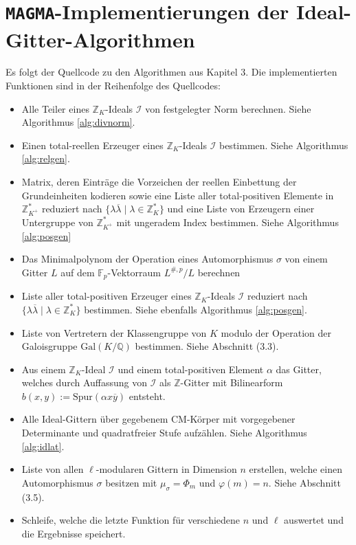 \documentclass[12pt,a4paper,halfparskip,headsepline,bibtotocnumbered]{scrreprt}
\theoremstyle{nummermitklammern}
\theoremstyle{nonumberbreak}
\newcommand{\Z}{\mathbb{Z}}
\newcommand{\Q}{\mathbb{Q}}
\newcommand{\F}{\mathbb{F}}
\newcommand{\I}{\mathcal{I}}
\begin{document}
\section{\texttt{MAGMA}-Implementierungen der Ideal-Gitter-Algorithmen}
Es folgt der Quellcode zu den Algorithmen aus Kapitel 3. Die implementierten Funktionen sind in der Reihenfolge des Quellcodes:
\begin{itemize}
	\item Alle Teiler eines $\Z_K$-Ideals $\I$ von festgelegter Norm berechnen. Siehe Algorithmus \eqref{alg:divnorm}.
	\item Einen total-reellen Erzeuger eines $\Z_K$-Ideals $\I$ bestimmen. Siehe Algorithmus \eqref{alg:relgen}.
	\item Matrix, deren Einträge die Vorzeichen der reellen Einbettung der Grundeinheiten kodieren sowie eine Liste aller total-positiven Elemente in $\Z_{K^+}^\ast$ reduziert nach $\lbrace \lambda \overline{\lambda} \mid \lambda \in \Z_K^\ast \rbrace$ und eine Liste von Erzeugern einer Untergruppe von $\Z_{K^+}^\ast$ mit ungeradem Index bestimmen. Siehe Algorithmus \eqref{alg:posgen}
	\item Das Minimalpolynom der Operation eines Automorphismus $\sigma$ von einem Gitter $L$ auf dem $\F_p$-Vektorraum $L^{\#,p}/L$ berechnen
	\item Liste aller total-positiven Erzeuger eines $\Z_K$-Ideals $\I$ reduziert nach $\lbrace \lambda \overline{\lambda} \mid \lambda \in \Z_K^\ast \rbrace$ bestimmen. Siehe ebenfalls Algorithmus \eqref{alg:posgen}.
	\item Liste von Vertretern der Klassengruppe von $K$ modulo der Operation der Galoisgruppe $\text{Gal}(K/\Q)$ bestimmen. Siehe Abschnitt (3.3).
	\item Aus einem $\Z_K$-Ideal $\I$ und einem total-positiven Element $\alpha$ das Gitter, welches durch Auffassung von $\I$ als $\Z$-Gitter mit Bilinearform $b(x,y) := \text{Spur}(\alpha x \overline{y})$ entsteht.
	\item Alle Ideal-Gittern über gegebenem CM-Körper mit vorgegebener Determinante und quadratfreier Stufe aufzählen. Siehe Algorithmus \eqref{alg:idlat}.
	\item Liste von allen $\ell$-modularen Gittern in Dimension $n$ erstellen, welche einen Automorphismus $\sigma$ besitzen mit $\mu_\sigma = \Phi_m$ und $\varphi(m) = n$. Siehe Abschnitt (3.5).
	\item Schleife, welche die letzte Funktion für verschiedene $n$ und $\ell$ auswertet und die Ergebnisse speichert.
\end{itemize}

\end{document}
